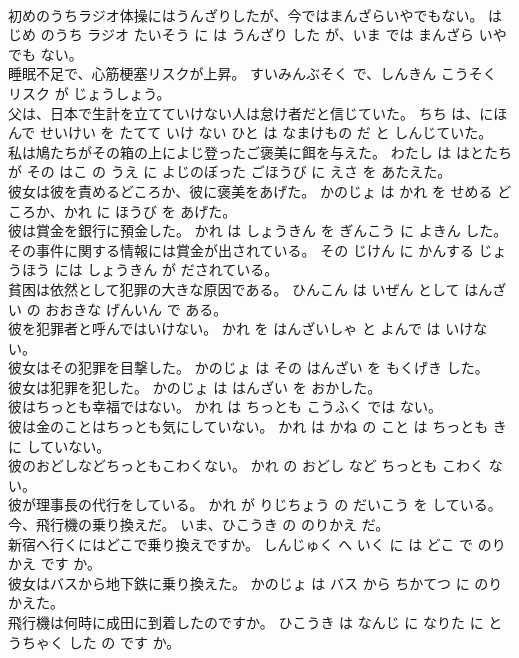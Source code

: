 \documentclass[8pt]{extreport}
\begin{document}
\begin{CJK}{UTF8}{min}
\\	初めのうちラジオ体操にはうんざりしたが、今ではまんざらいやでもない。	はじめ のうち ラジオ たいそう に は うんざり した が、いま では まんざら いや でも ない。	
\\	睡眠不足で、心筋梗塞リスクが上昇。	すいみんぶそく で、しんきん こうそく リスク が じょうしょう。	
\\	父は、日本で生計を立てていけない人は怠け者だと信じていた。	ちち は、にほんで せいけい を たてて いけ ない ひと は なまけもの だ と しんじていた。	
\\	私は鳩たちがその箱の上によじ登ったご褒美に餌を与えた。	わたし は はとたち が その はこ の うえ に よじのぼった ごほうび に えさ を あたえた。	
\\	彼女は彼を責めるどころか、彼に褒美をあげた。	かのじょ は かれ を せめる どころか、かれ に ほうび を あげた。	
\\	彼は賞金を銀行に預金した。	かれ は しょうきん を ぎんこう に よきん した。	
\\	その事件に関する情報には賞金が出されている。	その じけん に かんする じょうほう には しょうきん が だされている。	
\\	貧困は依然として犯罪の大きな原因である。	ひんこん は いぜん として はんざい の おおきな げんいん で ある。	
\\	彼を犯罪者と呼んではいけない。	かれ を はんざいしゃ と よんで は いけない。	
\\	彼女はその犯罪を目撃した。	かのじょ は その はんざい を もくげき した。	
\\	彼女は犯罪を犯した。	かのじょ は はんざい を おかした。	
\\	彼はちっとも幸福ではない。	かれ は ちっとも こうふく では ない。	
\\	彼は金のことはちっとも気にしていない。	かれ は かね の こと は ちっとも き に していない。	
\\	彼のおどしなどちっともこわくない。	かれ の おどし など ちっとも こわく ない。	
\\	彼が理事長の代行をしている。	かれ が りじちょう の だいこう を している。	
\\	今、飛行機の乗り換えだ。	いま、ひこうき の のりかえ だ。	
\\	新宿へ行くにはどこで乗り換えですか。	しんじゅく へ いく に は どこ で のりかえ です か。	
\\	彼女はバスから地下鉄に乗り換えた。	かのじょ は バス から ちかてつ に のりかえた。	
\\	飛行機は何時に成田に到着したのですか。	ひこうき は なんじ に なりた に とうちゃく した の です か。	

\end{CJK}
\end{document}

